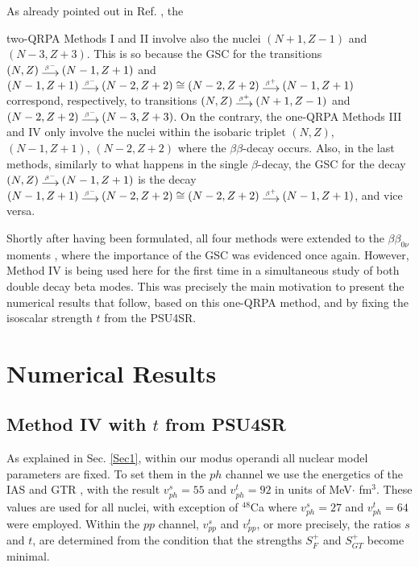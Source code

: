 \documentclass[nofootinbib,twocolumn,eqsecnum,floats,aps]{revtex4}
\def\b {{\beta}}
\def\bp{\:\raisebox{-.5ex}{$\stackrel{{\mbox {\tiny $\beta^+$}}}
{{\textstyle\longrightarrow}}$}\:}
\def\bn{\:\raisebox{-.5ex}{$\stackrel{{\mbox {\tiny $\beta^-$}}}
{{\textstyle\longrightarrow}}$}\:}
\begin{document}
As already pointed out in Ref. \cite{Kr05},  the { two-QRPA Methods I and II
involve also the  nuclei $ (N+1,Z-1)$ and  $(N-3,Z+3)$. This is so
because  the GSC  for  the transitions  $(N,Z)\bn (N-1,Z+1)$
and  $(N-1,Z+1)\bn (N-2,Z+2)\cong (N-2,Z+2)\bp(N-1,Z+1)$
correspond, respectively, to transitions  $(N,Z)\bp (N+1,Z-1)$
and  $(N-2,Z+2)\bn (N-3,Z+3)$.
On the contrary,  the one-QRPA Methods III and IV only involve
the nuclei within the isobaric triplet $(N, Z)$,  $(N-1,
Z+1)$, $(N-2, Z+2)$ where the $\b\b$-decay occurs.
Also, in the last methods, similarly to what happens in the single $ \b$-decay,
the GSC for the decay
  $(N,Z)\bn (N-1,Z+1)$ is the decay $(N-1,Z+1)\bn (N-2,Z+2)\cong (N-2,Z+2)\bp(N-1,Z+1)$, and vice versa.

Shortly after having been formulated, 
 all four methods were extended
to the $\b\b_{0\nu}$ moments   \cite{Tom87,Eng88,Krm94,Krm94a,Bar97,Bar98,Bar99},
where the importance of the GSC was  evidenced once again.
However, Method IV
 is being used here for the first time 
 in a simultaneous study of both double decay beta modes. This was precisely the main motivation to present the numerical results that follow, based on this one-QRPA method, and by fixing the isoscalar strength $t$ from the PSU4SR.



\bigskip

\section{Numerical Results}\label{Sec4}
\subsection{ Method IV with $t$ from PSU4SR %
}\label{4A}

As explained in Sec. \ref{Sec1}, within our modus operandi all nuclear model parameters
are fixed.  To set them in the $ph$ channel we use the energetics of
the IAS and GTR \cite{Nak82}, with the result $v^s_{ph}=55$ and
$v^t_{ph}=92$ in units of MeV$\cdot$ fm$^3$. These values are used for
all nuclei, with exception of $^{48}$Ca where $v^s_{ph}=27$ and
$v^t_{ph}=64$ were employed.
Within the $pp$ channel, $v^s_{pp}$ and $v^t_{pp}$,
or more precisely, the ratios
$s$ and $t$, are determined from the condition that the strengths $S^+_F$ and
$S^+_{GT}$ become minimal.




}
\end{document}
